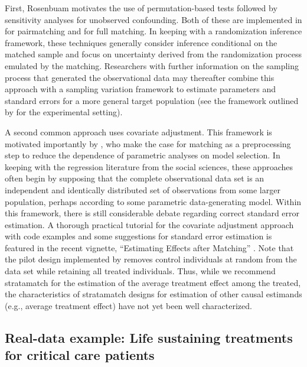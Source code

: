 First, Rosenbuam \citep{rosenbaum2005sensitivity, rosenbaum2010designbook} motivates the use of permutation-based tests followed by sensitivity analyses for unobserved confounding. Both of these are implemented in  \citep{rosenbaum2014senmw, rosenbaum2015Rpackages} for pairmatching and  \citep{rosenbaum2017sensitivityfull, rosenbaum2007mestimates} for full matching. In keeping with a randomization inference framework, these techniques generally consider inference conditional on the matched sample and focus on uncertainty derived from the randomization process emulated by the matching. Researchers with further information on the sampling process that generated the observational data may thereafter combine this approach with a sampling variation framework to estimate parameters and standard errors for a more general target population (see the framework outlined by \citet{tipton2013improving} for the experimental setting).

A second common approach uses covariate adjustment.  This framework is motivated importantly by \citet{ho2007matching}, who make the case for matching as a preprocessing step to reduce the dependence of parametric analyses on model selection. In keeping with the regression literature from the social sciences, these approaches often begin by supposing that the complete observational data set is an independent and identically distributed set of observations from some larger population, perhaps according to some parametric data-generating model. Within this framework, there is still considerable debate regarding correct standard error estimation. A thorough practical tutorial for the covariate adjustment approach with code examples and some suggestions for standard error estimation is featured in the recent  vignette, ``Estimating Effects after Matching'' \citep{Greifer2020-sz}. Note that the pilot design implemented by  removes control individuals at random from the data set while retaining all treated individuals. Thus, while we recommend stratamatch for the estimation of the average treatment effect among the treated, the characteristics of stratamatch designs for estimation of other causal estimands (e.g., average treatment effect) have not yet been well characterized.

\subsection{Real-data example: Life sustaining treatments for critical care patients}\label{subsec:real_eg}

